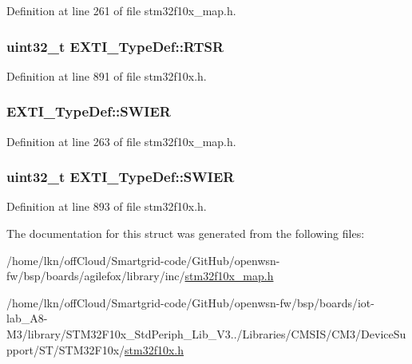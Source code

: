 Definition at line 261 of file stm32f10x\+\_\+map.\+h.

\subsubsection[{\texorpdfstring{R\+T\+SR}{RTSR}}]{ {\bf uint32\+\_\+t} E\+X\+T\+I\+\_\+\+Type\+Def\+::\+R\+T\+SR}\hypertarget{struct_e_x_t_i___type_def_ac019d211d8c880b327a1b90a06cc0675}{}\label{struct_e_x_t_i___type_def_ac019d211d8c880b327a1b90a06cc0675}


Definition at line 891 of file stm32f10x.\+h.

\subsubsection[{\texorpdfstring{S\+W\+I\+ER}{SWIER}}]{ E\+X\+T\+I\+\_\+\+Type\+Def\+::\+S\+W\+I\+ER}\hypertarget{struct_e_x_t_i___type_def_ab07004687cf077d41614786cf297c7bc}{}\label{struct_e_x_t_i___type_def_ab07004687cf077d41614786cf297c7bc}


Definition at line 263 of file stm32f10x\+\_\+map.\+h.

\subsubsection[{\texorpdfstring{S\+W\+I\+ER}{SWIER}}]{ {\bf uint32\+\_\+t} E\+X\+T\+I\+\_\+\+Type\+Def\+::\+S\+W\+I\+ER}\hypertarget{struct_e_x_t_i___type_def_a5c1f538e64ee90918cd158b808f5d4de}{}\label{struct_e_x_t_i___type_def_a5c1f538e64ee90918cd158b808f5d4de}


Definition at line 893 of file stm32f10x.\+h.



The documentation for this struct was generated from the following files\+:\begin{DoxyCompactItemize}
\item 
/home/lkn/off\+Cloud/\+Smartgrid-\/code/\+Git\+Hub/openwsn-\/fw/bsp/boards/agilefox/library/inc/\hyperlink{agilefox_2library_2inc_2stm32f10x__map_8h}{stm32f10x\+\_\+map.\+h}\item 
/home/lkn/off\+Cloud/\+Smartgrid-\/code/\+Git\+Hub/openwsn-\/fw/bsp/boards/iot-\/lab\+\_\+\+A8-\/\+M3/library/\+S\+T\+M32\+F10x\+\_\+\+Std\+Periph\+\_\+\+Lib\+\_\+\+V3../\+Libraries/\+C\+M\+S\+I\+S/\+C\+M3/\+Device\+Support/\+S\+T/\+S\+T\+M32\+F10x/\hyperlink{iot-lab___a8-_m3_2library_2_s_t_m32_f10x___std_periph___lib___v3_85_80_2_libraries_2_c_m_s_i_s_26497265545392eb5694b064ae15018db}{stm32f10x.\+h}\end{DoxyCompactItemize}
